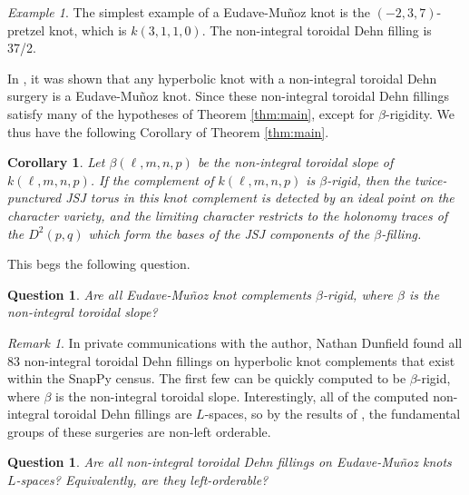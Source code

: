 \documentclass{article}
\theoremstyle{plain}
\theoremstyle{definition}
\theoremstyle{plain}
\theoremstyle{plain}
\newtheorem{corollary}[theorem]{Corollary}
\theoremstyle{plain}
\theoremstyle{remark}
\newtheorem{remark}[theorem]{Remark}
\theoremstyle{remark}
\newtheorem{example}[theorem]{Example}
\theoremstyle{plain}
\newtheorem{conjecture}[theorem]{Conjecture}
\theoremstyle{plain}
\newtheorem{question}[theorem]{Question}
\begin{document}
\begin{example}
The simplest example of a Eudave-Muñoz knot is the $(-2, 3, 7)$-pretzel knot, which is $k(3, 1, 1, 0)$. The non-integral toroidal Dehn filling is 37/2. 
\end{example}

In \cite{gordonleucke}, it was shown that any hyperbolic knot with a non-integral toroidal Dehn surgery is a Eudave-Muñoz knot. Since these non-integral toroidal Dehn fillings satisfy many of the hypotheses of Theorem \ref{thm:main}, except for $\beta$-rigidity. We thus have the following Corollary of Theorem \ref{thm:main}.

\begin{corollary}
Let $\beta(\ell, m, n, p)$ be the non-integral toroidal slope of $k(\ell, m, n, p)$. If the complement of $k(\ell, m, n, p)$ is $\beta$-rigid, then the twice-punctured JSJ torus in this knot complement is detected by an ideal point on the character variety, and the limiting character restricts to the holonomy traces of the $D^2(p, q)$ which form the bases of the JSJ components of the $\beta$-filling.
\end{corollary}

This begs the following question.

\begin{question}
Are all Eudave-Muñoz knot complements $\beta$-rigid, where $\beta$ is the non-integral toroidal slope?
\end{question}

\begin{remark}
In private communications with the author, Nathan Dunfield found all 83 non-integral toroidal Dehn fillings on hyperbolic knot complements that exist within the SnapPy census. The first few can be quickly computed to be $\beta$-rigid, where $\beta$ is the non-integral toroidal slope. Interestingly, all of the computed non-integral toroidal Dehn fillings are $L$-spaces, so by the results of \cite{hanselman}, the fundamental groups of these surgeries are non-left orderable. 
\end{remark}

\begin{question}
Are all non-integral toroidal Dehn fillings on Eudave-Muñoz knots $L$-spaces? Equivalently, are they left-orderable? 
\end{question}

%
\end{document}
